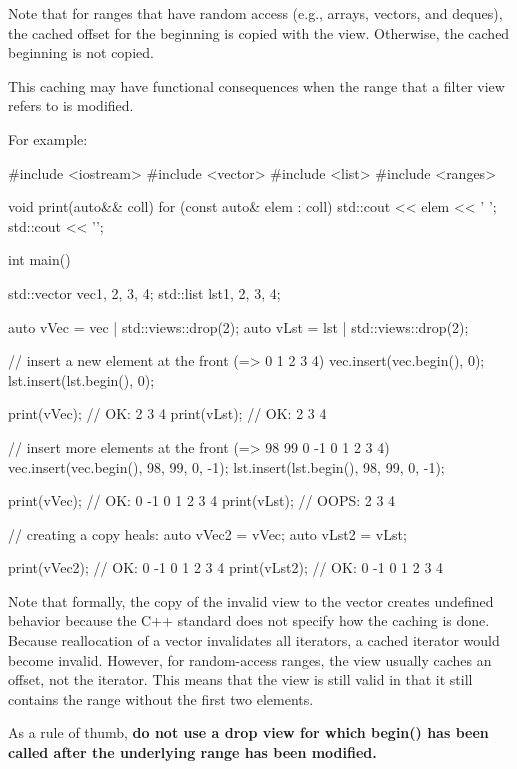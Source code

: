 Note that for ranges that have random access (e.g., arrays, vectors, and deques), the cached offset for the beginning is copied with the view. Otherwise, the cached beginning is not copied.

This caching may have functional consequences when the range that a filter view refers to is modified.

For example:


\begin{cpp}
#include <iostream>
#include <vector>
#include <list>
#include <ranges>

void print(auto&& coll)
{
	for (const auto& elem : coll) {
		std::cout << elem << ' ';
	}
	std::cout << '\n';
}

int main()
{
	std::vector vec{1, 2, 3, 4};
	std::list lst{1, 2, 3, 4};
	
	auto vVec = vec | std::views::drop(2);
	auto vLst = lst | std::views::drop(2);
	
	// insert a new element at the front (=> 0 1 2 3 4)
	vec.insert(vec.begin(), 0);
	lst.insert(lst.begin(), 0);
	
	print(vVec); // OK: 2 3 4
	print(vLst); // OK: 2 3 4
	
	// insert more elements at the front (=> 98 99 0 -1 0 1 2 3 4)
	vec.insert(vec.begin(), {98, 99, 0, -1});
	lst.insert(lst.begin(), {98, 99, 0, -1});
	
	print(vVec); // OK: 0 -1 0 1 2 3 4
	print(vLst); // OOPS: 2 3 4
	
	// creating a copy heals:
	auto vVec2 = vVec;
	auto vLst2 = vLst;
	
	print(vVec2); // OK: 0 -1 0 1 2 3 4
	print(vLst2); // OK: 0 -1 0 1 2 3 4
}
\end{cpp}

Note that formally, the copy of the invalid view to the vector creates undefined behavior because the C++ standard does not specify how the caching is done. Because reallocation of a vector invalidates all iterators, a cached iterator would become invalid. However, for random-access ranges, the view usually caches an offset, not the iterator. This means that the view is still valid in that it still contains the range without the first two elements.

As a rule of thumb, \textbf{do not use a drop view for which begin() has been called after the underlying range has been modified.}


